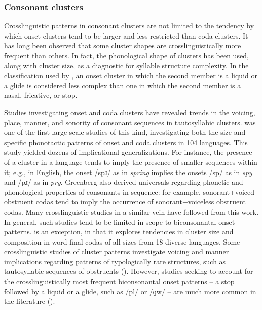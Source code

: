 \subsubsection{{Consonant} {clusters}}\label{sec:1.1.2.3}

  Crosslinguistic patterns in consonant clusters are not limited to the tendency by which onset clusters tend to be larger and less restricted than coda clusters. It has long been observed that some cluster shapes are crosslinguistically more frequent than others. In fact, the phonological shape of clusters has been used, along with cluster size, as a diagnostic for syllable structure complexity. In the classification used by \citet{Maddieson2013a}, an onset cluster in which the second member is a liquid or a glide is considered less complex than one in which the second member is a nasal, fricative, or stop.

  Studies investigating onset and coda clusters have revealed trends in the voicing, place, manner, and sonority of consonant sequences in tautosyllabic clusters. \citet{Greenberg19651978} was one of the first large-scale studies of this kind, investigating both the size and specific phonotactic patterns of onset and coda clusters in 104 languages. This study yielded dozens of implicational generalizations. For instance, the presence of a cluster in a language tends to imply the presence of smaller sequences within it; e.g., in English, the onset /spɹ/ as in \textit{spring} implies the onsets /sp/ as in \textit{spy} and /pɹ/ as in \textit{pry}. Greenberg also derived universals regarding phonetic and phonological properties of consonants in sequence: for example, sonorant+voiced obstruent codas tend to imply the occurrence of sonorant+voiceless obstruent codas. Many crosslinguistic studies in a similar vein have followed from this work. In general, such studies tend to be limited in scope to biconsonantal onset patterns. \citet{VanDam2004} is an exception, in that it explores tendencies in cluster size and composition in word-final codas of all sizes from 18 diverse languages. Some crosslinguistic studies of cluster patterns investigate voicing and manner implications regarding patterns of typologically rare structures, such as tautosyllabic sequences of obstruents (\citealt{Morelli1999,Morelli2003,Kreitman2008}). However, studies seeking to account for the crosslinguistically most frequent biconsonantal onset patterns -- a stop followed by a liquid or a glide, such as /pl/ or /ɡw/ -- are much more common in the literature (\citealt{Clements1990,BerentEtAl2008,BerentEtAl2011,Parker2012,Vennemann2012}). 

